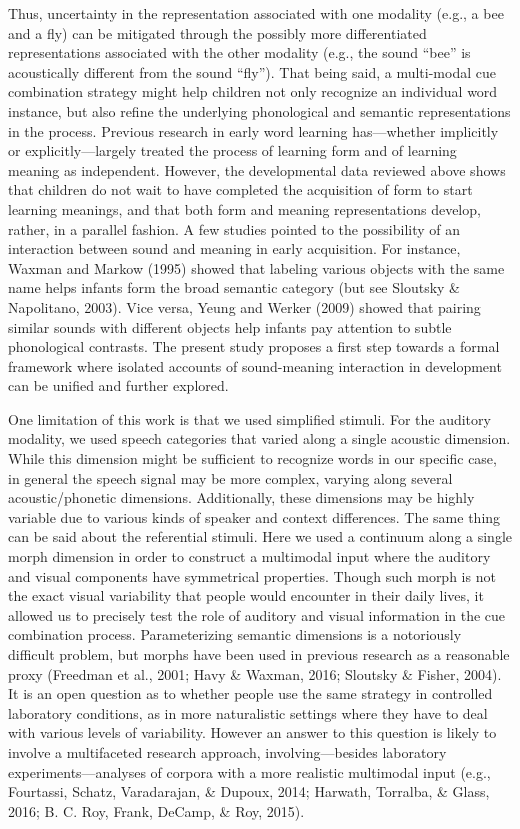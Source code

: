 \documentclass[english,floatsintext,man]{apa6}
\theoremstyle{definition}
\theoremstyle{definition}
\theoremstyle{definition}
\theoremstyle{remark}
\begin{document}
Thus, uncertainty in the representation associated with one modality
(e.g., a bee and a fly) can be mitigated through the possibly more
differentiated representations associated with the other modality (e.g.,
the sound \enquote{bee} is acoustically different from the sound
\enquote{fly}). That being said, a multi-modal cue combination strategy
might help children not only recognize an individual word instance, but
also refine the underlying phonological and semantic representations in
the process. Previous research in early word learning has---whether
implicitly or explicitly---largely treated the process of learning form
and of learning meaning as independent. However, the developmental data
reviewed above shows that children do not wait to have completed the
acquisition of form to start learning meanings, and that both form and
meaning representations develop, rather, in a parallel fashion. A few
studies pointed to the possibility of an interaction between sound and
meaning in early acquisition. For instance, Waxman and Markow (1995)
showed that labeling various objects with the same name helps infants
form the broad semantic category (but see Sloutsky \& Napolitano, 2003).
Vice versa, Yeung and Werker (2009) showed that pairing similar sounds
with different objects help infants pay attention to subtle phonological
contrasts. The present study proposes a first step towards a formal
framework where isolated accounts of sound-meaning interaction in
development can be unified and further explored.

One limitation of this work is that we used simplified stimuli. For the
auditory modality, we used speech categories that varied along a single
acoustic dimension. While this dimension might be sufficient to
recognize words in our specific case, in general the speech signal may
be more complex, varying along several acoustic/phonetic dimensions.
Additionally, these dimensions may be highly variable due to various
kinds of speaker and context differences. The same thing can be said
about the referential stimuli. Here we used a continuum along a single
morph dimension in order to construct a multimodal input where the
auditory and visual components have symmetrical properties. Though such
morph is not the exact visual variability that people would encounter in
their daily lives, it allowed us to precisely test the role of auditory
and visual information in the cue combination process. Parameterizing
semantic dimensions is a notoriously difficult problem, but morphs have
been used in previous research as a reasonable proxy (Freedman et al.,
2001; Havy \& Waxman, 2016; Sloutsky \& Fisher, 2004). It is an open
question as to whether people use the same strategy in controlled
laboratory conditions, as in more naturalistic settings where they have
to deal with various levels of variability. However an answer to this
question is likely to involve a multifaceted research approach,
involving---besides laboratory experiments---analyses of corpora with a
more realistic multimodal input (e.g., Fourtassi, Schatz, Varadarajan,
\& Dupoux, 2014; Harwath, Torralba, \& Glass, 2016; B. C. Roy, Frank,
DeCamp, \& Roy, 2015).
\end{document}
